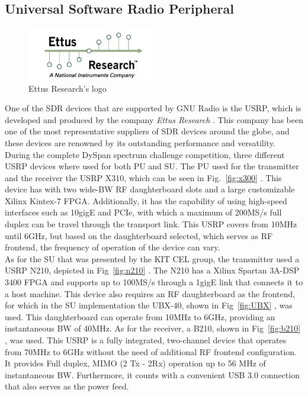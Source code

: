 \subsection{Universal Software Radio Peripheral}
\begin{figure}[htb]
    \centering
      \includegraphics[width=0.5\textwidth]{figures/ettus_logo}
      \caption{Ettus Research's logo}
      \label{fig:ettus}
\end{figure}

One of the \ac{SDR} devices that are supported by GNU Radio is the \ac{USRP}, which is developed and produced by the company \emph{Ettus Research\texttrademark} \cite{Ettus}. This company has been one of the most representative suppliers of \ac{SDR} devices around the globe, and these devices are renowned by its outstanding performance and versatility.\\

During the complete \ac{DySpan} spectrum challenge competition, three different \ac{USRP} devices where used for both \ac{PU} and \ac{SU}. The \ac{PU} used for the transmitter and the receiver the \ac{USRP} X310, which can be seen in Fig.~\ref{fig:x300} \cite{X300}. This device has with two wide-\ac{BW} \ac{RF} daughterboard slots and a large customizable Xilinx Kintex-7 FPGA. Additionally, it has the capability of using high-speed interfaces such as 10gigE and PCIe, with which a maximum of 200MS/s full duplex can be travel through the transport link. This \ac{USRP} covers from 10MHz until 6GHz, but based on the daughterboard selected, which serves as \ac{RF} frontend, the frequency of operation of the device can vary.\\

As for the \ac{SU} that was presented by the \ac{KIT} \ac{CEL} group, the transmitter used a \ac{USRP} N210, depicted in Fig~\ref{fig:n210} \cite{N210}. The N210 has a Xilinx Spartan 3A-DSP 3400 FPGA and supports up to 100MS/s through a 1gigE link that connects it to a host machine.  This device also requires an \ac{RF} daughterboard as the frontend, for which in the \ac{SU} implementation the UBX-40, shown in Fig~\ref{fig:UBX} \cite{UBX}, was used. This daughterboard can operate from 10MHz to 6GHz, providing an instantaneous \ac{BW} of 40MHz. As for the receiver, a B210, shown in Fig~\ref{fig:b210} \cite{B210}, was used. This \ac{USRP} is a fully integrated, two-channel device that operates from 70MHz to 6GHz without the need of additional \ac{RF} frontend configuration. It provides Full duplex, MIMO (2 Tx - 2Rx) operation up to 56 MHz of instantaneous \ac{BW}. Furthermore, it counts with a convenient USB 3.0 connection that also serves as the power feed.\\

